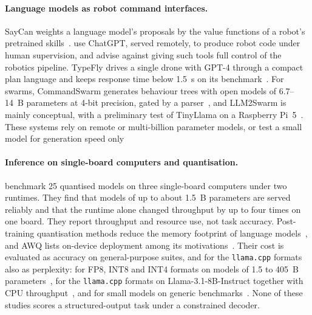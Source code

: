 \documentclass[a4paper,fleqn]{cas-dc}
\begin{document}
\paragraph{Language models as robot command interfaces.} SayCan weights a language model's
proposals by the value functions of a robot's pretrained skills~\citep{saycan2022}. \citet{chatgptrobotics2024} use ChatGPT, served remotely, to produce robot code under human
supervision, and advise against giving such tools full control of the robotics pipeline.
TypeFly drives a single drone with GPT-4 through a compact plan language and keeps response time
below 1.5~s on its benchmark~\citep{typefly2024}. For swarms, CommandSwarm generates behaviour
trees with open models of 6.7--14~B parameters at 4-bit precision, gated by a
parser~\citep{commandswarm2026}, and LLM2Swarm is mainly conceptual, with a preliminary test of
TinyLlama on a Raspberry Pi~5~\citep{llm2swarm2024}. These systems rely on remote or multi-billion
parameter models, or test a small model for generation speed only

\paragraph{Inference on single-board computers and quantisation.} \citet{sbc2025} benchmark 25
quantised models on three single-board computers under two runtimes. They find that models of up
to about 1.5~B parameters are served reliably and that the runtime alone changed throughput by up
to four times on one board. They report throughput and resource use, not task
accuracy. Post-training quantisation methods reduce the memory footprint of language
models~\citep{gptq}, and AWQ lists on-device deployment among its motivations~\citep{awq}. Their cost is evaluated as accuracy on
general-purpose suites, and for the \texttt{llama.cpp} formats also as perplexity: for FP8, INT8 and INT4 formats on models of 1.5 to 405~B
parameters~\citep{kurtic2025}, for the \texttt{llama.cpp}
formats on Llama-3.1-8B-Instruct together with CPU throughput~\citep{kurt2026}, and for small
models on generic benchmarks~\citep{slmquant}. None of these studies scores a structured-output
task under a constrained decoder.
\end{document}
